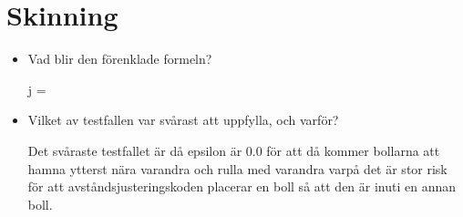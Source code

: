 \documentclass[a4paper,12pt]{article}
\begin{document}
\section{Skinning}

\begin{itemize}
\item  Vad blir den förenklade formeln?

  j = 

\item Vilket av testfallen var svårast att uppfylla, och varför?

  Det svåraste testfallet är då epsilon är 0.0 för att då kommer bollarna att hamna ytterst nära varandra och rulla med varandra varpå det är stor risk för att avståndsjusteringskoden placerar en boll så att den är inuti en annan boll.


\end{itemize}
\end{document}
